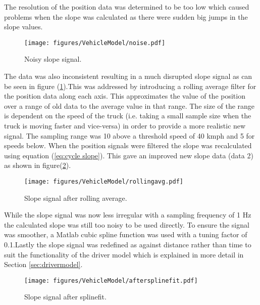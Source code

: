 \documentclass[ExampleMasters.tex]{subfiles}
\begin{document}
	The resolution of the position data was determined to be too low which caused problems when the slope was calculated as there were sudden big jumps in the slope values.

	\begin{figure}[hb]
		\begin{center}
			\texttt{[image: figures/VehicleModel/noise.pdf]}
		\end{center}
		\caption{Noisy slope signal.}
		\label{fig:noise}
	\end{figure}

	The data was also inconsistent resulting in a much disrupted slope signal as can be seen in figure (\ref{fig:noise}).This was addressed by introducing a rolling average filter for the position data along each axis. This approximates the value of the position over a range of old data to the average value in that range. The size of the range is dependent on the speed of the truck (i.e. taking a small sample size when the truck is moving faster and vice-versa) in order to provide a more realistic new signal. The sampling range was 10 above a threshold speed of 40 kmph and 5 for speeds below. When the position signals were filtered the slope was recalculated using equation (\ref{eq:cycle slope}). This gave an improved new slope data (data 2) as shown in figure(\ref{fig:rollingavg}).

	\begin{figure}
		\begin{center}
			\texttt{[image: figures/VehicleModel/rollingavg.pdf]}
		\end{center}
		\caption{Slope signal after rolling average.}
		\label{fig:rollingavg}
	\end{figure}

	While the slope signal was now less irregular with a sampling frequency of 1 Hz the calculated slope was still too noisy to be used directly. To ensure the signal was smoother, a Matlab cubic spline function was used with a tuning factor of 0.1.Lastly the slope signal was redefined as against distance rather than time to suit the functionality of the driver model which is explained in more detail in Section  \ref{sec:drivermodel}.

	\begin{figure}
		\begin{center}
			\texttt{[image: figures/VehicleModel/aftersplinefit.pdf]}
		\end{center}
		\caption{Slope signal after splinefit.}
		\label{fig:aftersplinefit}
	\end{figure}

	\newpage
\end{document}
